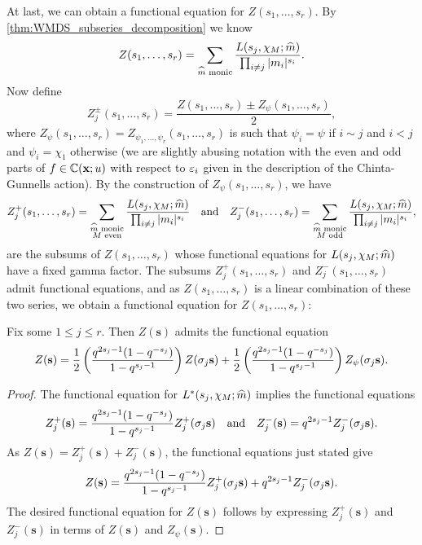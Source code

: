\documentclass[12pt,reqno,oneside]{amsart}
\begin{document}
    At last, we can obtain a functional equation for $Z(s_{1},\ldots,s_{r})$. By \cref{thm:WMDS_subseries_decomposition} we know
    \[
        Z(s_{1},\ldots,s_{r}) = \sum_{\text{$\widehat{m}$ monic}}\frac{L(s_{j},\chi_{M};\widehat{m})}{\prod_{i \neq j}|m_{i}|^{s_{i}}}.
    \]
    Now define
    \[
        Z_{j}^{\pm}(s_{1},\ldots,s_{r}) = \frac{Z(s_{1},\ldots,s_{r}) \pm Z_{\psi}(s_{1},\ldots,s_{r})}{2},
    \]
    where $Z_{\psi}(s_{1},\ldots,s_{r}) = Z_{\psi_{1},\ldots,\psi_{r}}(s_{1},\ldots,s_{r})$ is such that $\psi_{i} = \psi$ if $i \sim j$ and $i < j$ and $\psi_{i} = \chi_{1}$ otherwise (we are slightly abusing notation with the even and odd parts of $f \in \mathbb{C}(\mathbf{x};u)$ with respect to $\varepsilon_{i}$ given in the description of the Chinta-Gunnells action). By the construction of $Z_{\psi}(s_{1},\ldots,s_{r})$, we have
    \[
        Z_{j}^{+}(s_{1},\ldots,s_{r}) = \sum_{\substack{\text{$\widehat{m}$ monic} \\ \text{$M$ even}}}\frac{L(s_{j},\chi_{M};\widehat{m})}{\prod_{i \neq j}|m_{i}|^{s_{i}}} \quad \text{and} \quad Z_{j}^{-}(s_{1},\ldots,s_{r}) = \sum_{\substack{\text{$\widehat{m}$ monic} \\ \text{$M$ odd}}}\frac{L(s_{j},\chi_{M};\widehat{m})}{\prod_{i \neq j}|m_{i}|^{s_{i}}},
    \]
    are the subsums of $Z(s_{1},\ldots,s_{r})$ whose functional equations for $L(s_{j},\chi_{M};\widehat{m})$ have a fixed gamma factor. The subsums $Z_{j}^{+}(s_{1},\ldots,s_{r})$ and $Z_{j}^{-}(s_{1},\ldots,s_{r})$ admit functional equations, and as $Z(s_{1},\ldots,s_{r})$ is a linear combination of these two series, we obtain a functional equation for $Z(s_{1},\ldots,s_{r})$:

    \begin{theorem}\label{thm:WMDS_functional_equations}
        Fix some $1 \le j \le r$. Then $Z(\mathbf{s})$ admits the functional equation
        \[
            Z(\mathbf{s}) = \frac{1}{2}\left(\frac{q^{2s_{j}-1}(1-q^{-s_{j}})}{1-q^{s_{j}-1}}\right)Z(\sigma_{j}\mathbf{s})+\frac{1}{2}\left(\frac{q^{2s_{j}-1}(1-q^{-s_{j}})}{1-q^{s_{j}-1}}\right)Z_{\psi}(\sigma_{j}\mathbf{s}).
        \]
    \end{theorem}
    \begin{proof}
        The functional equation for $L^{\ast}(s_{j},\chi_{M};\widehat{m})$ implies the functional equations
        \[
            Z_{j}^{+}(\mathbf{s}) = \frac{q^{2s_{j}-1}(1-q^{-s_{j}})}{1-q^{s_{j}-1}}Z_{j}^{+}(\sigma_{j}\mathbf{s}) \quad \text{and} \quad Z_{j}^{-}(\mathbf{s}) = q^{2s_{j}-1}Z_{j}^{-}(\sigma_{j}\mathbf{s}).
        \]
        As $Z(\mathbf{s}) = Z_{j}^{+}(\mathbf{s})+Z_{j}^{-}(\mathbf{s})$, the functional equations just stated give
        \[
            Z(\mathbf{s}) = \frac{q^{2s_{j}-1}(1-q^{-s_{j}})}{1-q^{s_{j}-1}}Z_{j}^{+}(\sigma_{j}\mathbf{s})+q^{2s_{j}-1}Z_{j}^{-}(\sigma_{j}\mathbf{s}).
        \]
        The desired functional equation for $Z(\mathbf{s})$ follows by expressing $Z_{j}^{+}(\mathbf{s})$ and $Z_{j}^{-}(\mathbf{s})$ in terms of $Z(\mathbf{s})$ and $Z_{\psi}(\mathbf{s})$.
    \end{proof}
\end{document}
